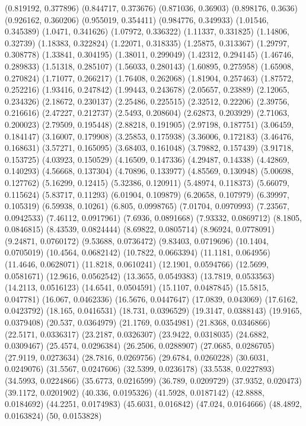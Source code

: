 {(0.819192, 0.377896)
(0.844717, 0.373676)
(0.871036, 0.36903)
(0.898176, 0.3636)
(0.926162, 0.360206)
(0.955019, 0.354411)
(0.984776, 0.349933)
(1.01546, 0.345389)
(1.0471, 0.341626)
(1.07972, 0.336322)
(1.11337, 0.331825)
(1.14806, 0.32739)
(1.18383, 0.322824)
(1.22071, 0.318335)
(1.25875, 0.313367)
(1.29797, 0.308778)
(1.33841, 0.304195)
(1.38011, 0.299049)
(1.42312, 0.294145)
(1.46746, 0.289833)
(1.51318, 0.285107)
(1.56033, 0.280143)
(1.60895, 0.275958)
(1.65908, 0.270824)
(1.71077, 0.266217)
(1.76408, 0.262068)
(1.81904, 0.257463)
(1.87572, 0.252216)
(1.93416, 0.247842)
(1.99443, 0.243678)
(2.05657, 0.23889)
(2.12065, 0.234326)
(2.18672, 0.230137)
(2.25486, 0.225515)
(2.32512, 0.22206)
(2.39756, 0.216616)
(2.47227, 0.212737)
(2.5493, 0.208604)
(2.62873, 0.203929)
(2.71063, 0.200023)
(2.79509, 0.195448)
(2.88218, 0.191905)
(2.97198, 0.187751)
(3.06459, 0.184147)
(3.16007, 0.179908)
(3.25853, 0.175938)
(3.36006, 0.172183)
(3.46476, 0.168631)
(3.57271, 0.165095)
(3.68403, 0.161048)
(3.79882, 0.157439)
(3.91718, 0.153725)
(4.03923, 0.150529)
(4.16509, 0.147336)
(4.29487, 0.14338)
(4.42869, 0.140293)
(4.56668, 0.137304)
(4.70896, 0.133977)
(4.85569, 0.130948)
(5.00698, 0.127762)
(5.16299, 0.12415)
(5.32386, 0.120911)
(5.48974, 0.118373)
(5.66079, 0.115624)
(5.83717, 0.11293)
(6.01904, 0.109879)
(6.20658, 0.107979)
(6.39997, 0.105319)
(6.59938, 0.10261)
(6.805, 0.0998765)
(7.01704, 0.0970993)
(7.23567, 0.0942533)
(7.46112, 0.0917961)
(7.6936, 0.0891668)
(7.93332, 0.0869712)
(8.1805, 0.0846815)
(8.43539, 0.0824444)
(8.69822, 0.0805714)
(8.96924, 0.0778091)
(9.24871, 0.0760172)
(9.53688, 0.0736472)
(9.83403, 0.0719696)
(10.1404, 0.0705019)
(10.4564, 0.0682142)
(10.7822, 0.0663394)
(11.1181, 0.064956)
(11.4646, 0.0628071)
(11.8218, 0.0610241)
(12.1901, 0.0594766)
(12.5699, 0.0581671)
(12.9616, 0.0562542)
(13.3655, 0.0549383)
(13.7819, 0.0533563)
(14.2113, 0.0516123)
(14.6541, 0.0504591)
(15.1107, 0.0487845)
(15.5815, 0.047781)
(16.067, 0.0462336)
(16.5676, 0.0447647)
(17.0839, 0.043069)
(17.6162, 0.0423792)
(18.165, 0.0416531)
(18.731, 0.0396529)
(19.3147, 0.0388143)
(19.9165, 0.0379408)
(20.537, 0.0364979)
(21.1769, 0.0354981)
(21.8368, 0.0346866)
(22.5171, 0.0336317)
(23.2187, 0.0326307)
(23.9422, 0.0318035)
(24.6882, 0.0309467)
(25.4574, 0.0296384)
(26.2506, 0.0288907)
(27.0685, 0.0286705)
(27.9119, 0.0273634)
(28.7816, 0.0269756)
(29.6784, 0.0260228)
(30.6031, 0.0249076)
(31.5567, 0.0247606)
(32.5399, 0.0236178)
(33.5538, 0.0227893)
(34.5993, 0.0224866)
(35.6773, 0.0216599)
(36.789, 0.0209729)
(37.9352, 0.020473)
(39.1172, 0.0201902)
(40.336, 0.0195326)
(41.5928, 0.0187142)
(42.8888, 0.0184692)
(44.2251, 0.0174983)
(45.6031, 0.016842)
(47.024, 0.0164666)
(48.4892, 0.0163824)
(50, 0.0153828)
}

